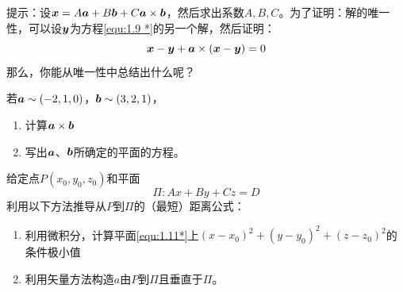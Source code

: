 \begin{exercise}
    提示：设$\boldsymbol{x}=A\boldsymbol{a}+B\boldsymbol{b}+C\boldsymbol{a}\times \boldsymbol{b}$，然后求出系数$A,B,C$。为了证明：解的唯一性，可以设$\boldsymbol{y}$为方程\eqref{equ:1.9 *}的另一个解，然后证明：
    \begin{equation*}
        \boldsymbol{x}-\boldsymbol{y}+\boldsymbol{a}\times \left( \boldsymbol{x}-\boldsymbol{y} \right) =0
    \end{equation*}
    那么，你能从唯一性中总结出什么呢？
    \item 若$\boldsymbol{a}\sim (-2,1,0)$，$\boldsymbol{b}\sim (3,2,1)$，
    \begin{enumerate}
        \item 计算$\boldsymbol{a}\times \boldsymbol{b}$
        \item 写出$\boldsymbol{a}$、$\boldsymbol{b}$所确定的平面的方程。
    \end{enumerate}
    \item 给定点$P(x_0,y_0,z_0)$和平面
    \begin{equation}\label{equ:1.11*}
        \Pi :Ax+By+Cz=D\tag{*}
    \end{equation}
    利用以下方法推导从$P$到$\Pi $的（最短）距离公式：
    \begin{enumerate}
        \item 利用微积分，计算平面\eqref{equ:1.11*}上$(x-x_0)^2+(y-y_0)^2+(z-z_0)^2$的条件极小值
        \item 利用矢量方法构造$a$由$P$到$\Pi$且垂直于$\Pi$。
        

\end{enumerate}
\end{exercise}
